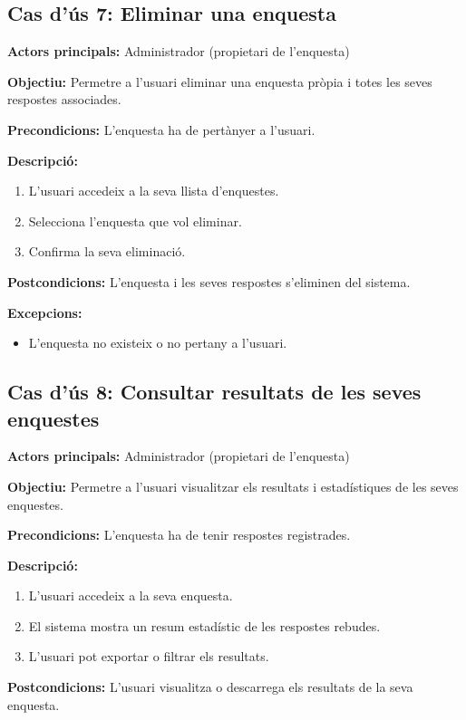 \documentclass[../main.tex]{subfiles}
\begin{document}
\subsection*{Cas d’ús 7: Eliminar una enquesta}

\textbf{Actors principals:} Administrador (propietari de l’enquesta)

\textbf{Objectiu:} Permetre a l’usuari eliminar una enquesta pròpia i totes les seves respostes associades.

\textbf{Precondicions:}  
L’enquesta ha de pertànyer a l’usuari.

\textbf{Descripció:}
\begin{enumerate}
    \item L’usuari accedeix a la seva llista d’enquestes.
    \item Selecciona l’enquesta que vol eliminar.
    \item Confirma la seva eliminació.
\end{enumerate}

\textbf{Postcondicions:}  
L’enquesta i les seves respostes s’eliminen del sistema.

\textbf{Excepcions:}
\begin{itemize}
    \item L’enquesta no existeix o no pertany a l’usuari.
\end{itemize}


\subsection*{Cas d’ús 8: Consultar resultats de les seves enquestes}

\textbf{Actors principals:} Administrador (propietari de l’enquesta)

\textbf{Objectiu:} Permetre a l’usuari visualitzar els resultats i estadístiques de les seves enquestes.

\textbf{Precondicions:}  
L’enquesta ha de tenir respostes registrades.

\textbf{Descripció:}
\begin{enumerate}
    \item L’usuari accedeix a la seva enquesta.
    \item El sistema mostra un resum estadístic de les respostes rebudes.
    \item L’usuari pot exportar o filtrar els resultats.
\end{enumerate}

\textbf{Postcondicions:}  
L’usuari visualitza o descarrega els resultats de la seva enquesta.
\end{document}

